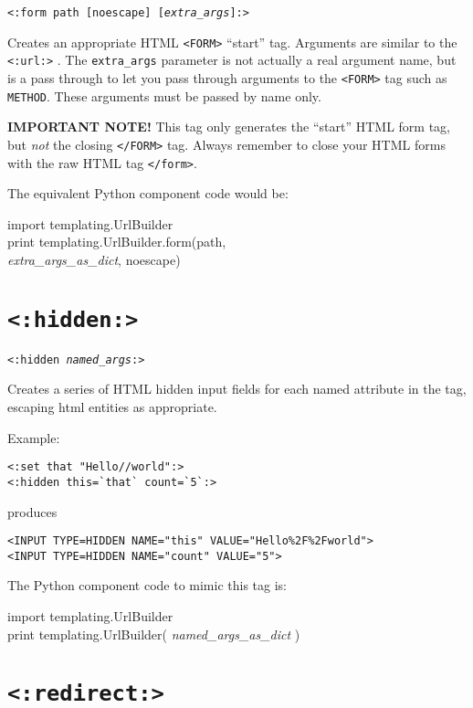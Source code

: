 \documentclass{manual}
\begin{document}
\texttt{<:form path [noescape] [\emph{extra_args}]:>}

Creates an appropriate HTML \texttt{<FORM>} ``start'' tag. 
Arguments are similar to the \texttt{<:url:>} .
The \texttt{extra_args} parameter is not actually a real argument name, but
is a pass through to let you pass through arguments to the
\texttt{<FORM>} 
tag such as \texttt{METHOD}. These arguments must be passed by name only.

\textbf{IMPORTANT NOTE!} This tag only generates the ``start'' HTML
form tag, but \emph{not} the closing \texttt{</FORM>} tag.
Always remember to close your HTML forms with the raw HTML tag
\texttt{</form>}.

The equivalent Python component code would be:
\begin{obeylines}\ttfamily
import templating.UrlBuilder
print templating.UrlBuilder.form(path,
     \textit{extra_args_as_dict}, noescape)
\end{obeylines}


\section{\texttt{<:hidden:>}}
\label{taghidden}

\texttt{<:hidden \emph{named_args}:>}

Creates a series of HTML hidden input fields for each named attribute
in the tag, escaping html entities as appropriate.

Example:

\begin{verbatim}
<:set that "Hello//world":>
<:hidden this=`that` count=`5`:>
\end{verbatim}

produces

\begin{verbatim}
<INPUT TYPE=HIDDEN NAME="this" VALUE="Hello%2F%2Fworld">
<INPUT TYPE=HIDDEN NAME="count" VALUE="5">
\end{verbatim}


The Python component code to mimic this tag is:
\begin{obeylines}\ttfamily
import templating.UrlBuilder
print templating.UrlBuilder( \emph{named_args_as_dict} )
\end{obeylines}

\section{\texttt{<:redirect:>}}
\label{tagredirect}
\end{document}
